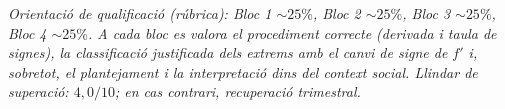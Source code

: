 \noindent\small\textit{Orientació de qualificació (rúbrica): Bloc 1 $\sim 25\%$,
Bloc 2 $\sim 25\%$, Bloc 3 $\sim 25\%$, Bloc 4 $\sim 25\%$. A cada bloc es valora el
procediment correcte (derivada i taula de signes), la classificació justificada dels
extrems amb el canvi de signe de $f'$ i, sobretot, el plantejament i la interpretació
dins del context social. Llindar de superació: $4,0/10$; en cas contrari, recuperació
trimestral.}
